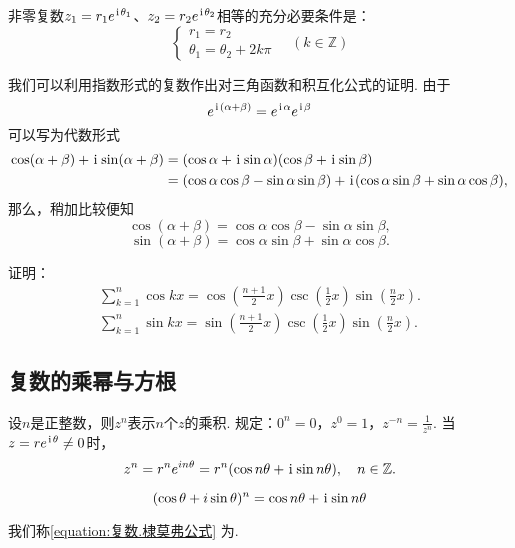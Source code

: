 \begin{theorem}[指数形式下复数相等条件]
非零复数\(z_1=r_1 e^{\kern1pt\mathrm{i}\kern1pt\theta_1}\)、\(z_2=r_2 e^{\kern1pt\mathrm{i}\kern1pt\theta_2}\)相等的充分必要条件是：\[
\left\{ \begin{array}{l}
r_1 = r_2 \\
\theta_1 = \theta_2 + 2k\pi
\end{array} \right. \quad (k \in \mathbb{Z})
\]
\end{theorem}

我们可以利用指数形式的复数作出对三角函数和积互化公式的证明.
由于\[
e^{\kern1pt\mathrm{i}\kern1pt(\alpha+\beta)}
= e^{\kern1pt\mathrm{i}\kern1pt\alpha} e^{\kern1pt\mathrm{i}\kern1pt\beta}
\]
可以写为代数形式
\[\begin{aligned}
\cos(\alpha+\beta)+\kern1pt\mathrm{i}\kern1pt\sin(\alpha+\beta)
&= (\cos\alpha+\kern1pt\mathrm{i}\kern1pt\sin\alpha)(\cos\beta+\kern1pt\mathrm{i}\kern1pt\sin\beta) \\
&= (\cos\alpha \cos\beta - \sin\alpha \sin\beta)
    + \kern1pt\mathrm{i}\kern1pt(\cos\alpha \sin\beta + \sin\alpha \cos\beta),
\end{aligned}\]
那么，稍加比较便知\[
\cos(\alpha+\beta) = \cos\alpha \cos\beta - \sin\alpha \sin\beta,
\]\[
\sin(\alpha+\beta) = \cos\alpha \sin\beta + \sin\alpha \cos\beta.
\]

\begin{example}
证明：\begin{gather}
\sum_{k=1}^n \cos kx
    = \cos(\frac{n+1}{2}x)
    \csc(\frac{1}{2}x)
    \sin(\frac{n}{2}x). \\
\sum_{k=1}^n \sin kx
    = \sin(\frac{n+1}{2}x)
    \csc(\frac{1}{2}x)
    \sin(\frac{n}{2}x).
\end{gather}
\end{example}

\subsection{复数的乘幂与方根}
\begin{definition}
设\(n\)是正整数，则\(z^n\)表示\(n\)个\(z\)的乘积.
规定：\(0^n=0\)，\(z^0=1\)，\(z^{-n}=\frac{1}{z^n}\).
当\(z=re^{\kern1pt\mathrm{i}\kern1pt\theta} \neq 0\)时，\[
z^n = r^n e^{in\theta} = r^n(\cos n\theta+\kern1pt\mathrm{i}\kern1pt\sin n\theta),
\quad n \in \mathbb{Z}.
\]
\end{definition}

\begin{theorem}[棣莫弗公式]
\begin{equation}\label{equation:复数.棣莫弗公式}
	(\cos\theta+i\sin\theta)^n = \cos{n\theta}+\kern1pt\mathrm{i}\kern1pt\sin{n\theta}
\end{equation}
\end{theorem}
我们称\cref{equation:复数.棣莫弗公式} 为.

